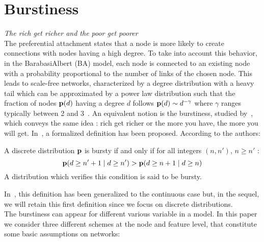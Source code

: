 \section{Burstiness}
\emph{The rich get richer and the poor get poorer} ~\\


The preferential attachment states that a node is more likely to create connections with nodes having a high degree. To take into account this behavior, in the BarabasiAlbert (BA) model, each node is connected to an existing node with a probability proportional to the number of links of the chosen node. This leads to scale-free networks, characterized by a degree distribution with a heavy tail which can be approximated by a power law distribution such that the fraction of nodes $\mathbf{p}(d)$ having a degree $d$ follows $\mathbf{p}(d) \sim d^{-\gamma}$ where $\gamma$ ranges typically between 2 and 3~\cite{barabasi1999emergence}. An equivalent notion is the burstiness, studied by~\cite{church1995poisson}, which conveys the same idea : rich get richer or the more you have, the more you will get. In~\cite{clinchant2008bnb}, a formalized definition has been proposed. According to the authors:

\begin{definition}[Burstiness]
	A discrete distribution $\mathbf{p}$ is bursty if and only if for all integers $(n, n')$, $n \geq n'$ :
	\begin{equation}
	\mathbf{p}(d \geq n'+1 \mid d \geq n') > \mathbf{p}(d \geq n+1 \mid d \geq n) 
	\end{equation}
	 A distribution which verifies this condition is said to be bursty.
\end{definition}

In~\cite{clinchant2010information}, this definition has been generalized to the continuous case but, in the sequel, we will retain this first definition since we focus on discrete distributions.~\\

The burstiness can appear for different various variable in a model. In this paper we consider three different schemes at the node and feature level, that constitute some basic assumptions on networks:

